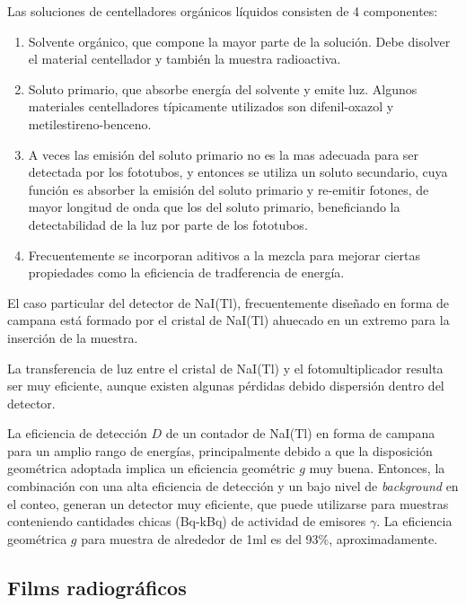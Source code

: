 %
Las soluciones de centelladores org\'anicos l\'iquidos consisten de 4 componentes:

\begin{enumerate}
	\item Solvente org\'anico, que compone la mayor parte de la soluci\'on. Debe disolver el material centellador y tambi\'en la 
	muestra radioactiva.
	\item Soluto primario, que absorbe energ\'ia del solvente y emite luz. Algunos materiales centelladores t\'ipicamente utilizados 
	son difenil-oxazol y metilestireno-benceno.
	\item A veces las emisi\'on del soluto primario no es la mas adecuada para ser detectada por los fototubos, y entonces se utiliza 
	un soluto secundario, cuya funci\'on es absorber la emisi\'on del soluto primario y re-emitir fotones, de mayor longitud de onda 
	que los del soluto primario, beneficiando la detectabilidad de la luz por parte de los fototubos.
	\item Frecuentemente se incorporan aditivos a la mezcla para mejorar ciertas propiedades como la eficiencia de tradferencia de 
	energ\'ia. 
\end{enumerate}

El caso particular del detector de NaI(Tl), frecuentemente dise\~nado en forma de campana est\'a formado por el cristal de NaI(Tl) 
ahuecado en un extremo para la inserci\'on 
de la muestra.

La transferencia de luz entre el cristal de NaI(Tl) y el fotomultiplicador resulta ser muy eficiente, aunque existen algunas p\'erdidas 
debido dispersi\'on 
dentro del detector.

La eficiencia de detecci\'on $D$ de un contador de NaI(Tl) en forma de campana para un amplio rango de energ\'ias, principalmente debido 
a 
que la disposici\'on geom\'etrica adoptada implica un eficiencia geom\'etric $g$ muy buena. Entonces, la combinaci\'on con una alta 
eficiencia de detecci\'on 
y un bajo nivel de \textit{background} en el conteo, generan un detector muy eficiente, que puede utilizarse para muestras conteniendo 
cantidades chicas 
(Bq-kBq) de actividad de emisores $\gamma$. La eficiencia geom\'etrica $g$ para muestra de alrededor de 1ml es del 93\%, aproximadamente.

\subsection{Films radiogr\'aficos}
\label{CapIII_10}


